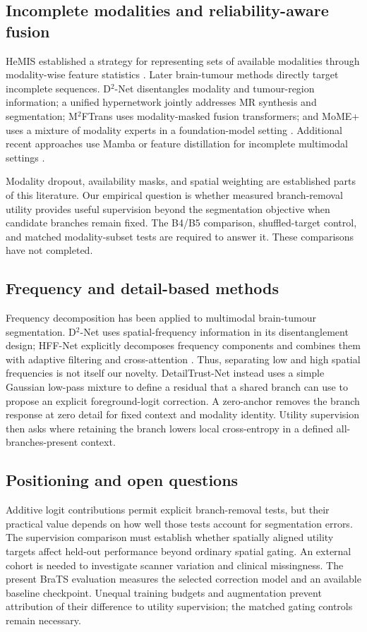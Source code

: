 \documentclass[conference]{IEEEtran}
\begin{document}
\subsection{Incomplete modalities and reliability-aware fusion}
HeMIS established a strategy for representing sets of available modalities through modality-wise feature statistics \cite{havaei2016hemis}. Later brain-tumour methods directly target incomplete sequences. D$^2$-Net disentangles modality and tumour-region information; a unified hypernetwork jointly addresses MR synthesis and segmentation; M$^2$FTrans uses modality-masked fusion transformers; and MoME+ uses a mixture of modality experts in a foundation-model setting \cite{yang2022d2,yang2023hyper,shi2024m2f,zhang2025mome}. Additional recent approaches use Mamba or feature distillation for incomplete multimodal settings \cite{zhang2026m2seg,kang2026mamba}.

Modality dropout, availability masks, and spatial weighting are established parts of this literature. Our empirical question is whether measured branch-removal utility provides useful supervision beyond the segmentation objective when candidate branches remain fixed. The B4/B5 comparison, shuffled-target control, and matched modality-subset tests are required to answer it. These comparisons have not completed.

\subsection{Frequency and detail-based methods}
Frequency decomposition has been applied to multimodal brain-tumour segmentation. D$^2$-Net uses spatial-frequency information in its disentanglement design; HFF-Net explicitly decomposes frequency components and combines them with adaptive filtering and cross-attention \cite{yang2022d2,shao2025hff}. Thus, separating low and high spatial frequencies is not itself our novelty. DetailTrust-Net instead uses a simple Gaussian low-pass mixture to define a residual that a shared branch can use to propose an explicit foreground-logit correction. A zero-anchor removes the branch response at zero detail for fixed context and modality identity. Utility supervision then asks where retaining the branch lowers local cross-entropy in a defined all-branches-present context.

\subsection{Positioning and open questions}
Additive logit contributions permit explicit branch-removal tests, but their practical value depends on how well those tests account for segmentation errors. The supervision comparison must establish whether spatially aligned utility targets affect held-out performance beyond ordinary spatial gating. An external cohort is needed to investigate scanner variation and clinical missingness. The present BraTS evaluation measures the selected correction model and an available baseline checkpoint. Unequal training budgets and augmentation prevent attribution of their difference to utility supervision; the matched gating controls remain necessary.
\end{document}
